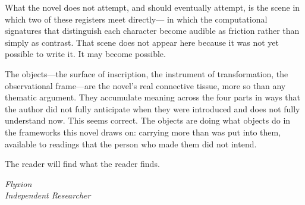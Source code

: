 What the novel does not attempt, and should eventually attempt,
is the scene in which two of these registers meet directly---
in which the computational signatures that distinguish each
character become audible as friction rather than simply as
contrast. That scene does not appear here because it was not
yet possible to write it. It may become possible.

The objects---the surface of inscription, the instrument of
transformation, the observational frame---are the novel's
real connective tissue, more so than any thematic argument.
They accumulate meaning across the four parts in ways that
the author did not fully anticipate when they were introduced
and does not fully understand now. This seems correct. The
objects are doing what objects do in the frameworks this novel
draws on: carrying more than was put into them, available to
readings that the person who made them did not intend.

The reader will find what the reader finds.

\bigskip

\noindent\textit{Flyxion}\\
\textit{Independent Researcher}


